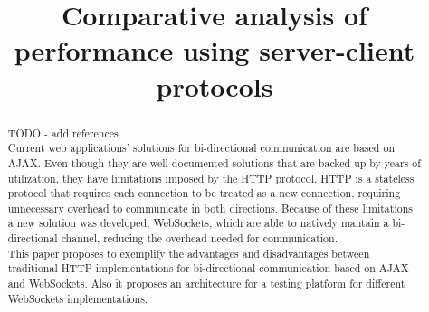 \documentclass[conference]{IEEEtran}
\begin{document}
\title{Comparative analysis of performance using server-client protocols}

\author{
\and
{}
}

\maketitle

\begin{abstract}
TODO - add references
\\
\indent
Current web applications' solutions for bi-directional communication are based on AJAX.
Even though they are well documented solutions that are backed up by years of
utilization, they have limitations imposed by the HTTP protocol. HTTP is a
stateless protocol that requires each connection to be treated as a new
connection, requiring unnecessary overhead to communicate in both directions.
Because of these limitations a new solution was developed, WebSockets,
which are able to natively mantain a bi-directional channel, reducing the
overhead needed for communication.
\\
\indent
This paper proposes to exemplify the advantages and disadvantages between
traditional HTTP implementations for bi-directional communication based on AJAX
and WebSockets. Also it proposes an architecture for a testing platform for
different WebSockets implementations.
\end{abstract}

\IEEEpeerreviewmaketitle

\end{document}
